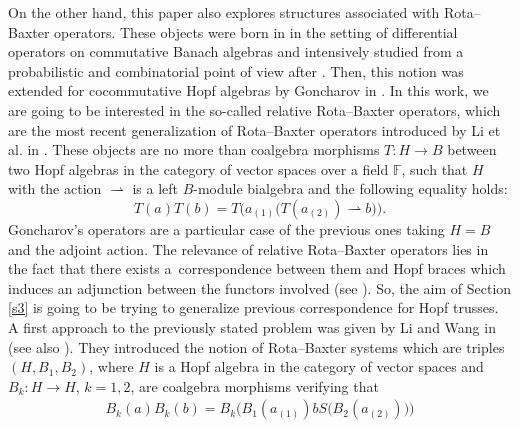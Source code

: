 \documentclass[pdftex]{sigma}
\numberwithin{equation}{section}
\begin{document}
On the other hand, this paper also explores structures associated with Rota--Baxter operators. These objects were born in \cite{BAXRB} in the setting of differential operators on commutative Banach algebras and intensively studied from a probabilistic and combinatorial point of view after \cite{RORB}. Then, this notion was extended for cocommutative Hopf algebras by Goncharov in \cite{Goncharov}. In this work, we are going to be interested in the so-called relative Rota--Baxter operators, which are the most recent generalization of Rota--Baxter operators introduced by Li et al. in \cite{LST}. These objects are no more than coalgebra morphisms $T\colon H\rightarrow B$ between two Hopf algebras in the category of vector spaces over a field $\mathbb{F}$, such that $H$ with the action $\rightharpoonup$ is a left $B$-module bialgebra and the following equality holds:
\begin{equation}\label{compatrRB-intro}
T(a)T(b)=T\bigl(a_{(1)}\bigl(T(a_{(2)})\rightharpoonup b\bigr)\bigr).
\end{equation}
Goncharov's operators are a particular case of the previous ones taking $H=B$ and the adjoint action. The relevance of relative Rota--Baxter operators lies in the fact that there exists a~correspondence between them and Hopf braces which induces an adjunction between the functors involved (see \cite[Theorem 3.3]{LST}). So, the aim of Section \ref{s3} is going to be trying to generalize previous correspondence for Hopf trusses. A first approach to the previously stated problem was given by Li and Wang in \cite{LW2} (see also \cite{LW}). They introduced the notion of Rota--Baxter systems which are triples $(H,B_{1},B_{2})$, where $H$ is a Hopf algebra in the category of vector spaces and $B_{k}\colon H\rightarrow H$, $k=1,2$, are coalgebra morphisms verifying that
\begin{align*}%
B_{k}(a)B_{k}(b)=B_{k}\bigl(B_{1}(a_{(1)})bS\bigl(B_{2}(a_{(2)})\bigr)\bigr)
\end{align*}
\end{document}
